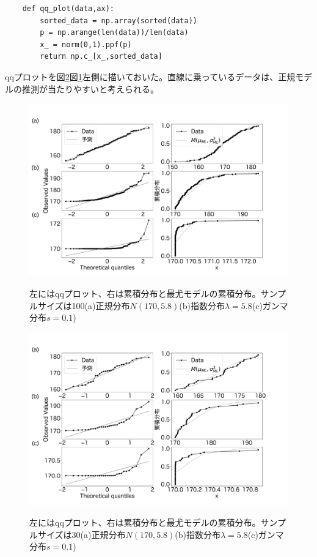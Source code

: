 \begin{lstlisting}
    def qq_plot(data,ax):
        sorted_data = np.array(sorted(data))
        p = np.arange(len(data))/len(data)
        x_ = norm(0,1).ppf(p)
        return np.c_[x_,sorted_data]
\end{lstlisting}


qqプロットを図\ref{fig:qq_cummlative_30}図\ref{fig:qq_cummlative}左側に描いておいた。直線に乗っているデータは、正規モデルの推測が当たりやすいと考えられる。

\begin{figure}
    \begin{center}
        \includegraphics[width=15cm]{./image/12_/qq_cummlative_expon_norm_gamma.pdf}
        \label{fig:qq_cummlative}
        \caption{左にはqqプロット、右は累積分布と最尤モデルの累積分布。サンプルサイズは100(a)正規分布$N(170,5.8)$(b)指数分布$\lambda=5.8$(c)ガンマ分布$s=0.1$)}
    \end{center}
\end{figure}

\begin{figure}
 \begin{center}
  \includegraphics[width=15cm]{./image/12_/qq_cummlative_expon_norm_gammaN_30.pdf}
  \label{fig:qq_cummlative_30}
  \caption{左にはqqプロット、右は累積分布と最尤モデルの累積分布。サンプルサイズは30(a)正規分布$N(170,5.8)$(b)指数分布$\lambda=5.8$(c)ガンマ分布$s=0.1$)}
 \end{center}
\end{figure}

